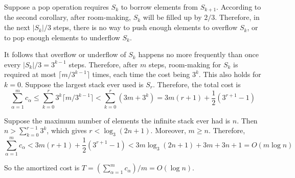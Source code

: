 \documentclass{article}
\begin{document}
Suppose a pop operation requires $S_k$ to borrow elements from $S_{k+1}$. According to the second corollary, after room-making, $S_k$ will be filled up by $2/3$. Therefore, in the next $|S_k|/3$ steps, there is no way to push enough elements to overflow $S_k$, or to pop enough elements to underflow $S_k$.

It follows that overflow or underflow of $S_k$ happens no more frequently than once every $|S_k|/3=3^{k-1}$ steps. Therefore, after $m$ steps, room-making for $S_k$ is required at most $\lceil m/3^{k-1}\rceil$ times, each time the cost being $3^k$. This also holds for $k=0$. Suppose the largest stack ever used is $S_r$. Therefore, the total cost is
\begin{equation*}
\sum_{\alpha=1}^mc_\alpha\leqslant\sum_{k=0}^r3^k\lceil m/3^{k-1}\rceil<\sum_{k=0}^r(3m+3^k)=3m(r+1)+\frac{1}{2}(3^{r+1}-1)
\end{equation*}

Suppose the maximum number of elements the infinite stack ever had is $n$. Then $n>\sum_{k=0}^{r-1}3^k$, which gives $r<\log_3(2n+1)$. Moreover, $m\geqslant n$. Therefore,
\begin{equation*}
\sum_{\alpha=1}^mc_\alpha<3m(r+1)+\frac{1}{2}(3^{r+1}-1)<3m\log_3(2n+1)+3m+3n+1=O(m\log n)
\end{equation*}

So the amortized cost is $T=(\sum_{\alpha=1}^mc_\alpha)/m=O(\log n)$.
\end{document}
